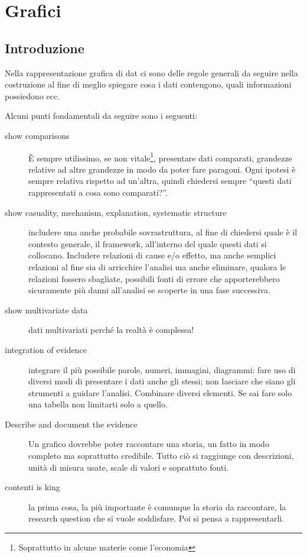 \chapter{Grafici}
\section{Introduzione}
Nella rappresentazione grafica di dat ci sono delle regole generali da seguire nella costruzione al fine di meglio spiegare cosa i dati contengono, quali informazioni possiedono ecc.

Alcuni punti fondamentali da seguire sono i seguenti:
\begin{description}
\item[show comparisons] È sempre utilissimo, se non vitale\footnote{Soprattutto in alcune materie come l'economia}, presentare dati comparati, grandezze relative ad altre grandezze in modo da poter fare paragoni. Ogni ipotesi è sempre relativa rispetto ad un'altra, quindi chiedersi sempre ``questi dati rappresentati a cosa sono comparati?''.

\item[show casuality, mechanism, explanation, systematic structure] includere una anche probabile sovrastruttura, al fine di chiedersi quale è il contesto generale, il framework, all'interno del quale questi dati si collocano. Includere relazioni di cause e/o effetto, ma anche semplici relazioni al fine sia di arricchire l'analisi ma anche eliminare, qualora le relazioni fossero sbagliate, possibili fonti di errore che apporterebbero sicuramente più danni all'analisi se scoperte in una fase successiva.

\item[show multivariate data] dati multivariati perché la realtà è complessa!

\item[integration of evidence] integrare il più possibile parole, numeri, immagini, diagrammi; fare uso di diversi modi di presentare i dati anche gli stessi; non lasciare che siano gli strumenti a guidare l'analisi. Combinare diversi elementi. Se sai fare solo una tabella non limitarti solo a quello.

\item[Describe and document the evidence] Un grafico dovrebbe poter raccontare una storia, un fatto in modo completo ma soprattutto credibile. Tutto ciò si raggiunge con descrizioni, unità di misura usate, scale di valori e soprattuto fonti.

\item[contenti is king] la prima cosa, la più importante è comunque la storia da raccontare, la research question che si vuole soddisfare. Poi si pensa a rappresentarli.
\end{description}

